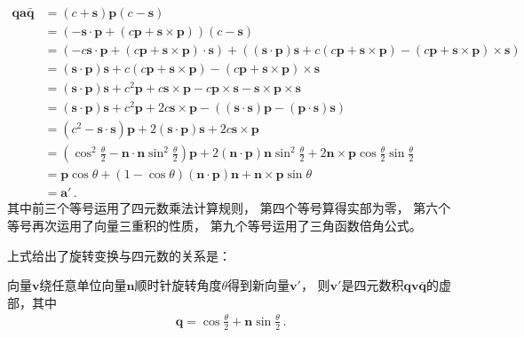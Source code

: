 \begin{align}
    \bm q\bm a\bar{\bm q} & =(c+\bm s)\bm p(c-\bm s)\nonumber                                                                                                                                                                \\
                          & =(-\bm s\cdot\bm p+(c\bm p+\bm s\times\bm p))(c-\bm s)\nonumber                                                                                                                                  \\
                          & =(-c\bm s\cdot\bm p+(c\bm p+\bm s\times\bm p)\cdot\bm s)+((\bm s\cdot\bm p)\bm s+c(c\bm p+\bm s\times\bm p)-(c\bm p+\bm s\times\bm p)\times\bm s)\nonumber                                       \\
                          & =(\bm s\cdot\bm p)\bm s+c(c\bm p+\bm s\times\bm p)-(c\bm p+\bm s\times\bm p)\times\bm s\nonumber                                                                                                 \\
                          & =(\bm s\cdot\bm p)\bm s+c^2\bm p+c\bm s\times\bm p-c\bm p\times\bm s-\bm s\times\bm p\times\bm s\nonumber                                                                                        \\
                          & =(\bm s\cdot\bm p)\bm s+c^2\bm p+2c\bm s\times\bm p-((\bm s\cdot\bm s)\bm p-(\bm p\cdot\bm s)\bm s)\nonumber                                                                                     \\
                          & =(c^2-\bm s\cdot\bm s)\bm p+2(\bm s\cdot\bm p)\bm s+2c\bm s\times\bm p\nonumber                                                                                                                  \\
                          & =\left(\cos^2\frac{\theta}{2}-\bm n\cdot\bm n\sin^2\frac{\theta}{2}\right)\bm p+2(\bm n\cdot\bm p)\bm n\sin^2\frac{\theta}{2}+2\bm n\times\bm p\cos\frac{\theta}{2}\sin\frac{\theta}{2}\nonumber \\
                          & =\bm p\cos\theta+(1-\cos\theta)(\bm n\cdot\bm p)\bm n+\bm n\times\bm p\sin\theta\nonumber                                                                                                        \\
                          & =\bm a'\, .
\end{align}
其中前三个等号运用了四元数乘法计算规则，
第四个等号算得实部为零，
第六个等号再次运用了向量三重积的性质，
第九个等号运用了三角函数倍角公式。

上式给出了旋转变换与四元数的关系是：
\begin{proposition}
    向量$\bm v$绕任意单位向量$\bm n$顺时针旋转角度$\theta$得到新向量$\bm v'$，
    则$\bm v'$是四元数积$\bm q\bm v\bar{\bm q}$的虚部，其中
    \begin{align}
        \bm q=\cos\frac{\theta}{2}+\bm n\sin\frac{\theta}{2}\, .
    \end{align}
\end{proposition}